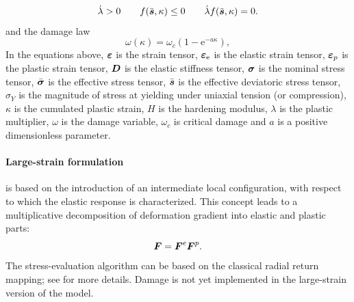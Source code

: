 \documentclass[a4paper]{article}
\newcommand{\mbf}[1]{\mbox{\boldmath$#1$}}
\newcommand{\veps}{\mbf{\varepsilon}}  %
\newcommand{\vsig}{\mbf{\sigma}}%
\newcommand{\vs}{\mbf{s}}%
\begin{document}
\begin{equation}\label{VMkuhnTucker}
\dot{\lambda} > 0 \qquad f(\bar{\vs},\kappa)\leq 0 \qquad \dot{\lambda} f(\bar{\vs},\kappa) = 0.
\end{equation}
and the damage law 
\begin{equation}\label{damagelawmp}
\omega(\kappa) = \omega_c(1-\mbox{e}^{-a\kappa}),
\end{equation}
In the equations above, $\veps$ is the strain tensor, $\veps_{\rm{e}}$ is the elastic strain tensor, $\veps_{p}$ is the plastic strain tensor, $\mbf{D}$ is the elastic stiffness tensor, $\vsig$ is the nominal stress tensor, $\bar{\vsig}$ is the effective stress tensor, $\bar{\vs}$ is the effective deviatoric stress tensor, $\sigma_Y$ is the magnitude of stress at yielding under uniaxial tension (or compression), $\kappa$ is the cumulated plastic strain, $H$ is the hardening modulus, $\lambda$ is the plastic multiplier, $\omega$ is the damage variable, $\omega_c$ is critical damage and $a$ is a positive dimensionless parameter.


\paragraph{Large-strain formulation}
is based on the introduction of an intermediate local configuration, with respect to which the elastic response is characterized. This concept leads to a multiplicative decomposition of deformation gradient into elastic and plastic parts:
\begin{equation}
\mbf{F} = \mbf{F}^e\mbf{F}^p.
\end{equation}
The stress-evaluation algorithm can be based on the 
classical radial return mapping; see \cite{SimoHughes} for more details. Damage is not yet implemented in the large-strain version of the model.
\end{document}
